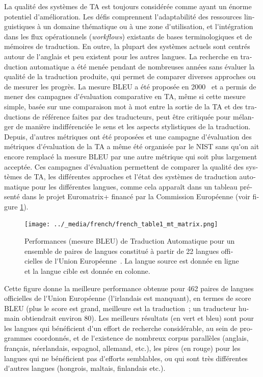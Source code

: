 \begin{french}
\begin{multicols}{2}
La qualité des systèmes de TA est toujours considérée comme ayant un
énorme potentiel d{\mbox '}amélioration. Les défis comprennent l{\mbox '}adaptabilité
des ressources linguistiques à un domaine thématique ou à une zone
d{\mbox '}utilisation, et l{\mbox '}intégration dans les flux opérationnels ({\em workflows}) existants de bases
terminologiques et de mémoires de traduction. En outre, la plupart des
systèmes actuels sont centrés autour de l{\mbox '}anglais et peu existent pour
les autres langues. La recherche en traduction automatique a été menée
pendant de nombreuses années sans évaluer la qualité de la traduction
produite, qui permet de comparer diverses approches ou de mesurer les
progrès. La mesure BLEU a été proposée en 2000~\cite{bleu02} et a permis de mener
des campagnes d{\mbox '}évaluation comparative en TA, même si cette mesure
simple, basée sur une comparaison mot à mot entre la sortie de la
TA et des traductions de référence faites par des
traducteurs, peut être critiquée pour mélanger de manière
indifférenciée le sens et les aspects stylistiques de la
traduction. Depuis, d{\mbox '}autres métriques ont été proposées et une
campagne d{\mbox '}évaluation des métriques d{\mbox '}évaluation de la TA a même été
organisée par le NIST sans qu{\mbox '}on ait encore remplacé la mesure BLEU
par une autre métrique qui soit plus largement acceptée. Ces campagnes
d{\mbox '}évaluation permettent de comparer la qualité des systèmes de TA, les
différentes approches et l{\mbox '}état des systèmes de traduction automatique pour les
différentes langues, comme cela apparaît dans un tableau présenté dans
le projet Euromatrix+ financé par la Commission Européenne (voir figure \ref{fig:euromatrixplus}).

\begin{figure}[!ht]
\begin{center}
  \texttt{[image: ../\_media/french/french\_table1\_mt\_matrix.png]}
  \caption{Performances (mesure BLEU) de Traduction Automatique pour un ensemble de paires de langues constitué à partir de 22 langues officielles de l{\mbox '}Union Européenne~\cite{mt462}. La langue source est donnée en ligne et la langue cible est donnée en colonne.}
  \label{fig:euromatrixplus}
\end{center}
\end{figure}

Cette figure donne la meilleure performance obtenue pour 462 paires de
langues officielles de l{\mbox '}Union Européenne (l{\mbox '}irlandais est manquant),
en termes de score BLEU (plus le score est grand, meilleure est la
traduction~; un traducteur humain obtiendrait environ 80). Les
meilleurs résultats (en vert et bleu) sont pour les langues qui
bénéficient d{\mbox '}un effort de recherche considérable, au sein de
programmes coordonnés, et de l{\mbox '}existence de nombreux corpus parallèles
(anglais, français, néerlandais, espagnol, allemand, etc.), les pires
(en rouge) pour les langues qui ne bénéficient pas d{\mbox '}efforts
semblables, ou qui sont très différentes d{\mbox '}autres langues (hongrois,
maltais, finlandais etc.).


\end{multicols}
\end{french}
